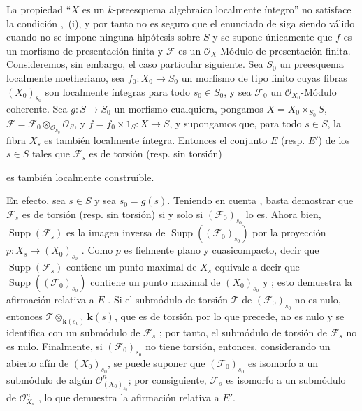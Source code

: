 \begin{remark}[9.4.9]
\label{IV.9.4.9}
La propiedad ``$X$ es un $k$-preesquema algebraico localmente íntegro'' no satisface la condición ,~(i), y por tanto no es seguro que el enunciado de  siga siendo válido cuando no se impone ninguna hipótesis sobre $S$ y se supone únicamente que $f$ es un morfismo de presentación finita y $\mathcal F$ es un $\mathcal O_X$-Módulo de presentación finita. Consideremos, sin embargo, el caso particular siguiente. Sea $S_0$ un preesquema localmente noetheriano, sea $f_0:X_0\to S_0$ un morfismo de tipo finito cuyas fibras $(X_0)_{s_0}$ son localmente íntegras para todo $s_0\in S_0$, y sea $\mathcal F_0$ un $\mathcal O_{X_0}$-Módulo coherente. Sea $g:S\to S_0$ un morfismo cualquiera, pongamos
$X=X_0\times_{S_0}S$, $\mathcal F=\mathcal F_0\otimes_{\mathcal O_{S_0}}
\mathcal O_S$, y $f=f_0\times1_S:X\to S$, y supongamos que, para todo $s\in S$, la fibra $X_s$ es también localmente íntegra. Entonces el conjunto $E$ (resp. $E'$) de los $s\in S$ tales que $\mathcal F_s$ es de torsión (resp. sin torsión)


es también localmente construible.

En efecto, sea $s\in S$ y sea $s_0=g(s)$. Teniendo en cuenta , basta demostrar que $\mathcal F_s$ es de torsión (resp. sin torsión) si y solo si $(\mathcal F_0)_{s_0}$ lo es. Ahora bien, $\operatorname{Supp}(\mathcal F_s)$ es la imagen inversa de $\operatorname{Supp}((\mathcal F_0)_{s_0})$ por la proyección $p:X_s\to(X_0)_{s_0}$ . Como $p$ es fielmente plano y cuasicompacto, decir que $\operatorname{Supp}(\mathcal F_s)$ contiene un punto maximal de $X_s$ equivale a decir que $\operatorname{Supp}((\mathcal F_0)_{s_0})$ contiene un punto maximal de $(X_0)_{s_0}$  y ; esto demuestra la afirmación relativa a $E$ . Si el submódulo de torsión $\mathcal T$ de $(\mathcal F_0)_{s_0}$ no es nulo, entonces $\mathcal T\otimes_{\mathbf{k}(s_0)}\boldsymbol{k}(s)$, que es de torsión por lo que precede, no es nulo y se identifica con un submódulo de $\mathcal F_s$ ; por tanto, el submódulo de torsión de $\mathcal F_s$ no es nulo. Finalmente, si $(\mathcal F_0)_{s_0}$ no tiene torsión, entonces, considerando un abierto afín de $(X_0)_{s_0}$, se puede suponer que $(\mathcal F_0)_{s_0}$ es isomorfo a un submódulo de algún $\mathcal O_{(X_0)_{s_0}}^n$; por consiguiente, $\mathcal F_s$ es isomorfo a un submódulo de $\mathcal O_{X_s}^n$ , lo que demuestra la afirmación relativa a $E'$.
\end{remark}

